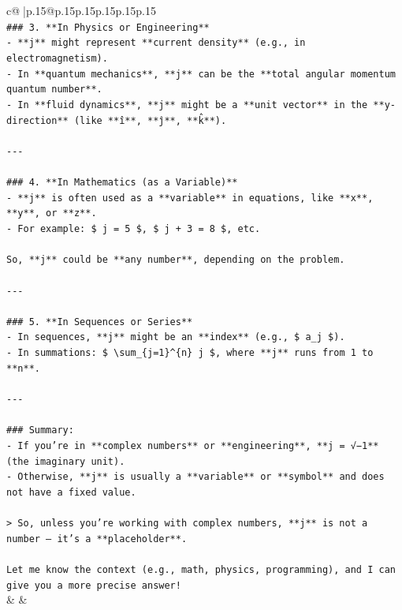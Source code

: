\documentclass{article}
\begin{document}
{\begin{supertabular}{c@{$\;$}|p{.15\linewidth}@{}p{.15\linewidth}p{.15\linewidth}p{.15\linewidth}p{.15\linewidth}p{.15\linewidth}}
{{{\\ 
\texttt{\#\#\# 3. **In Physics or Engineering**} \\
\texttt{{-} **j** might represent **current density** (e.g., in electromagnetism).} \\
\texttt{{-} In **quantum mechanics**, **j** can be the **total angular momentum quantum number**.} \\
\texttt{{-} In **fluid dynamics**, **j** might be a **unit vector** in the **y{-}direction** (like **î**, **ĵ**, **k̂**).} \\
\\ 
\texttt{{-}{-}{-}} \\
\\ 
\texttt{\#\#\# 4. **In Mathematics (as a Variable)**} \\
\texttt{{-} **j** is often used as a **variable** in equations, like **x**, **y**, or **z**.} \\
\texttt{{-} For example: \$ j = 5 \$, \$ j + 3 = 8 \$, etc.} \\
\\ 
\texttt{So, **j** could be **any number**, depending on the problem.} \\
\\ 
\texttt{{-}{-}{-}} \\
\\ 
\texttt{\#\#\# 5. **In Sequences or Series**} \\
\texttt{{-} In sequences, **j** might be an **index** (e.g., \$ a\_j \$).} \\
\texttt{{-} In summations: \$ \textbackslash{}sum\_\{j=1\}\^{}\{n\} j \$, where **j** runs from 1 to **n**.} \\
\\ 
\texttt{{-}{-}{-}} \\
\\ 
\texttt{\#\#\# Summary:} \\
\texttt{{-} If you're in **complex numbers** or **engineering**, **j = √−1** (the imaginary unit).} \\
\texttt{{-} Otherwise, **j** is usually a **variable** or **symbol** and does not have a fixed value.} \\
\\ 
\texttt{> So, unless you're working with complex numbers, **j** is not a number — it's a **placeholder**.} \\
\\ 
\texttt{Let me know the context (e.g., math, physics, programming), and I can give you a more precise answer!} \\
            }
        }
    }
    & & \\ \\


\end{supertabular}}
\end{document}
